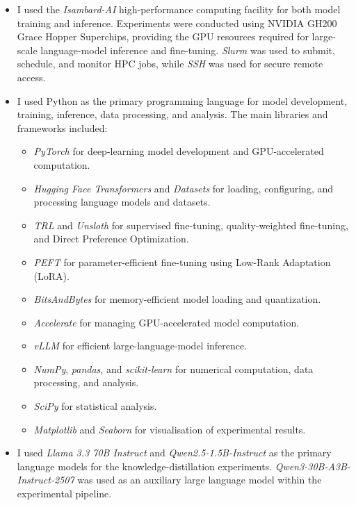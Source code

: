 \documentclass[ %
                    author={Aman Kumar Singh},
                supervisor={Dr. Edwin Simpson},
                    degree={MSc},
                     title={Quality-Aware Knowledge Distillation of Large Language Models for Efficient Personalised Clinical Report Generation},
                  subtitle={},
                      type={},
                      year={2021}]{dissertation}
\begin{document}
\begin{itemize}

\item I used the \textit{Isambard-AI} high-performance computing facility for both model training and inference. Experiments were conducted using NVIDIA GH200 Grace Hopper Superchips, providing the GPU resources required for large-scale language-model inference and fine-tuning. \textit{Slurm} was used to submit, schedule, and monitor HPC jobs, while \textit{SSH} was used for secure remote access.

\item I used Python as the primary programming language for model development, training, inference, data processing, and analysis. The main libraries and frameworks included:
\begin{itemize}
    \item \textit{PyTorch} for deep-learning model development and GPU-accelerated computation.
    \item \textit{Hugging Face Transformers} and \textit{Datasets} for loading, configuring, and processing language models and datasets.
    \item \textit{TRL} and \textit{Unsloth} for supervised fine-tuning, quality-weighted fine-tuning, and Direct Preference Optimization.
    \item \textit{PEFT} for parameter-efficient fine-tuning using Low-Rank Adaptation (LoRA).
    \item \textit{BitsAndBytes} for memory-efficient model loading and quantization.
    \item \textit{Accelerate} for managing GPU-accelerated model computation.
    \item \textit{vLLM} for efficient large-language-model inference.
    \item \textit{NumPy}, \textit{pandas}, and \textit{scikit-learn} for numerical computation, data processing, and analysis.
    \item \textit{SciPy} for statistical analysis.
    \item \textit{Matplotlib} and \textit{Seaborn} for visualisation of experimental results.
\end{itemize}

\item I used \textit{Llama 3.3 70B Instruct} and
\textit{Qwen2.5-1.5B-Instruct} as the primary language models for the
knowledge-distillation experiments. \textit{Qwen3-30B-A3B-Instruct-2507}
was used as an auxiliary large language model within the experimental
pipeline.


\end{itemize}
\end{document}
